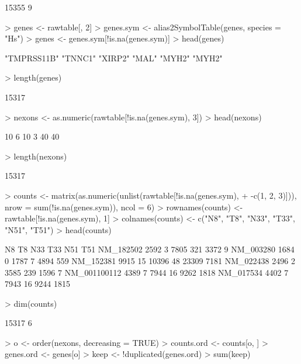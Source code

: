\begin{Schunk}
\begin{Soutput}
[1] 15355     9
\end{Soutput}
\begin{Sinput}
> genes <- rawtable[, 2]
> genes.sym <- alias2SymbolTable(genes, species = "Hs")
> genes <- genes.sym[!is.na(genes.sym)]
> head(genes)
\end{Sinput}
\begin{Soutput}
[1] "TMPRSS11B" "TNNC1"     "XIRP2"     "MAL"       "MYH2"      "MYH2"     
\end{Soutput}
\begin{Sinput}
> length(genes)
\end{Sinput}
\begin{Soutput}
[1] 15317
\end{Soutput}
\begin{Sinput}
> nexons <- as.numeric(rawtable[!is.na(genes.sym), 3])
> head(nexons)
\end{Sinput}
\begin{Soutput}
[1] 10  6 10  3 40 40
\end{Soutput}
\begin{Sinput}
> length(nexons)
\end{Sinput}
\begin{Soutput}
[1] 15317
\end{Soutput}
\begin{Sinput}
> counts <- matrix(as.numeric(unlist(rawtable[!is.na(genes.sym), 
+     -c(1, 2, 3)])), nrow = sum(!is.na(genes.sym)), ncol = 6)
> rownames(counts) <- rawtable[!is.na(genes.sym), 1]
> colnames(counts) <- c("N8", "T8", "N33", "T33", "N51", "T51")
> head(counts)
\end{Sinput}
\begin{Soutput}
               N8 T8   N33 T33   N51  T51
NM_182502    2592  3  7805 321  3372    9
NM_003280    1684  0  1787   7  4894  559
NM_152381    9915 15 10396  48 23309 7181
NM_022438    2496  2  3585 239  1596    7
NM_001100112 4389  7  7944  16  9262 1818
NM_017534    4402  7  7943  16  9244 1815
\end{Soutput}
\begin{Sinput}
> dim(counts)
\end{Sinput}
\begin{Soutput}
[1] 15317     6
\end{Soutput}
\begin{Sinput}
> o <- order(nexons, decreasing = TRUE)
> counts.ord <- counts[o, ]
> genes.ord <- genes[o]
> keep <- !duplicated(genes.ord)
> sum(keep)
\end{Sinput}
\begin{Soutput}

\end{Soutput}
\end{Schunk}
